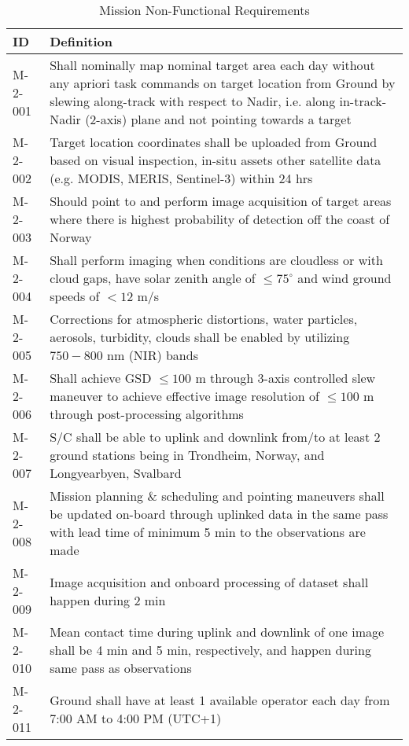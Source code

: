 \begin{table*}[htbp]
	\label{tab:non_func_reqs}
	\caption{Mission Non-Functional Requirements}
	\centering
	\begin{tabular}{l p{15cm}}
			\hline
		\textbf{ID}							&	\textbf{Definition} 			\\ 
			\hline
			M-2-001 & Shall nominally map nominal target area each day without any apriori task commands on target location from Ground by slewing along-track with respect to Nadir, i.e. along in-track-Nadir (2-axis) plane and not pointing towards a target \\
			\hline
			M-2-002 & Target location coordinates shall be uploaded from Ground based on visual inspection, in-situ assets other satellite data (e.g. MODIS, MERIS, Sentinel-3) within 24 hrs \\
			\hline
			M-2-003 & Should point to and perform image acquisition of target areas where there is highest probability of detection off the coast of Norway \\
			\hline
			M-2-004 & Shall perform imaging when conditions are cloudless or with cloud gaps, have solar zenith angle of $\leq75^{\circ}$ and wind ground speeds of $<12$ m/s \\
			\hline
			M-2-005  & Corrections for atmospheric distortions, water particles, aerosols, turbidity, clouds shall be enabled by utilizing $750-800$ nm (NIR) bands \\ 
			\hline
			M-2-006 & Shall achieve GSD $\leq100$ m through 3-axis controlled slew maneuver to achieve effective image resolution of $\leq100$ m through post-processing algorithms \\
			\hline
			M-2-007 & S/C shall be able to uplink and downlink from/to at least 2 ground stations being in Trondheim, Norway, and Longyearbyen, Svalbard \\
			\hline
			M-2-008  & Mission planning \& scheduling and pointing maneuvers shall be updated on-board through uplinked data in the same pass with lead time of minimum 5 min to the observations are made \\ 
			\hline		
			M-2-009  & Image acquisition and onboard processing of dataset shall happen during 2 min \\ 
			\hline
			M-2-010 & Mean contact time during uplink and downlink of one image shall be 4 min and 5 min, respectively, and happen during same pass as observations \\
			\hline
			M-2-011  & Ground shall have at least 1 available operator each day from 7:00 AM to 4:00 PM (UTC+1) \\ 

\end{tabular}
\end{table*}
